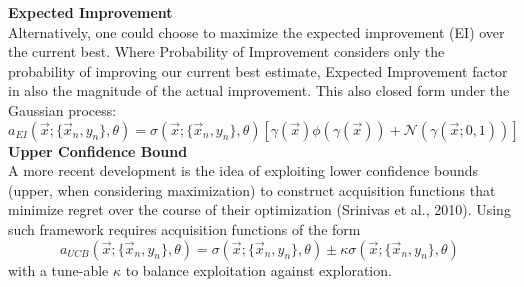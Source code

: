 \documentclass[12pt, a4paper]{article}
\begin{document}
\textbf{Expected Improvement} \\
Alternatively, one could choose to maximize the expected improvement (EI) over the current best. Where Probability of Improvement considers only the probability of improving our current best estimate, Expected Improvement factor in also the magnitude of the actual improvement. This also closed form under the Gaussian process:
\begin{equation}
\label{eq: ei_short}
    a_{EI}(\vec{x};\{\vec{x}_n ,y_n\},\theta) = \sigma(\vec{x};\{\vec{x}_n ,y_n\},\theta)
    [\gamma ( \vec{x} ) \phi(\gamma(\vec{x}))
    + \mathcal{N}(\gamma(\vec{x};0,1))]
\end{equation}
\textbf{Upper Confidence Bound}\\
A more recent development is the idea of exploiting lower confidence bounds (upper, when considering maximization) to construct acquisition functions that minimize regret over the course of their optimization (Srinivas et al., 2010). Using such framework requires acquisition functions of the form
\begin{equation}
    a_{UCB}(\vec{x};\{\vec{x}_n ,y_n\},\theta) = \sigma(\vec{x};\{\vec{x}_n ,y_n\},\theta)
    \pm \kappa \sigma(\vec{x};\{\vec{x}_n ,y_n\},\theta)
\end{equation}
with a tune-able $\kappa$ to balance exploitation against exploration.
\end{document}
